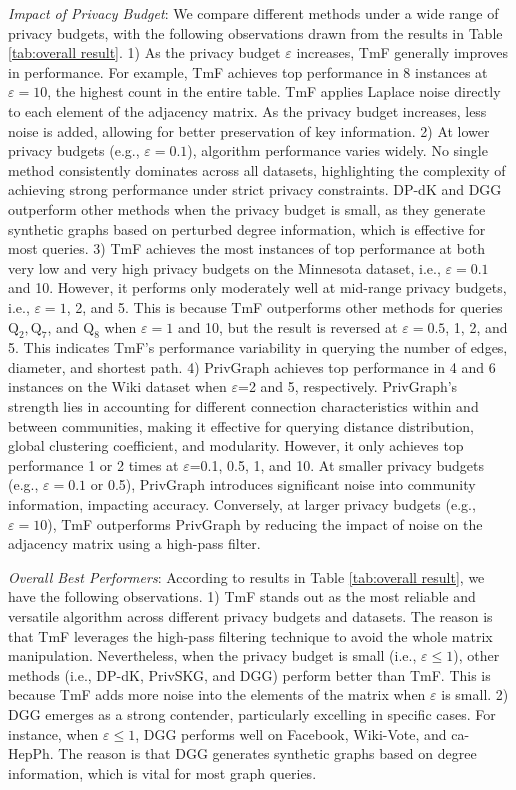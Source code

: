 \documentclass[conference]{IEEEtran}
\theoremstyle{plain}
\begin{document}
\textit{Impact of Privacy Budget}:
We compare different methods under a wide range of privacy budgets, with the following observations drawn from the results in Table \ref{tab:overall result}.
1) As the privacy budget $\varepsilon$ increases, TmF generally improves in performance. 
For example, TmF achieves top performance in 8 instances at $\varepsilon = 10$, the highest count in the entire table. 
TmF applies Laplace noise directly to each element of the adjacency matrix. 
As the privacy budget increases, less noise is added, allowing for better preservation of key information.
2) At lower privacy budgets (e.g., $\varepsilon = 0.1$), algorithm performance varies widely. 
No single method consistently dominates across all datasets, highlighting the complexity of achieving strong performance under strict privacy constraints. 
DP-dK and DGG outperform other methods when the privacy budget is small, as they generate synthetic graphs based on perturbed degree information, which is effective for most queries.
3) TmF achieves the most instances of top performance at both very low and very high privacy budgets on the Minnesota dataset, i.e., $\varepsilon=0.1$ and 10. 
However, it performs only moderately well at mid-range privacy budgets, i.e., $\varepsilon=1$, 2, and 5. 
This is because TmF outperforms other methods for queries ${\text{Q}_2}, {\text{Q}_7}$, and ${\text{Q}_8}$ when $\varepsilon=1$ and 10, but the result is reversed at $\varepsilon=0.5$, 1, 2, and 5. 
This indicates TmF’s performance variability in querying the number of edges, diameter, and shortest path.
4) PrivGraph achieves top performance in 4 and 6 instances on the Wiki dataset when $\varepsilon$=2 and 5, respectively. PrivGraph’s strength lies in accounting for different connection characteristics within and between communities, making it effective for querying distance distribution, global clustering coefficient, and modularity. However, it only achieves top performance 1 or 2 times at $\varepsilon$=0.1, 0.5, 1, and 10. At smaller privacy budgets (e.g., $\varepsilon=0.1$ or 0.5), PrivGraph introduces significant noise into community information, impacting accuracy. 
Conversely, at larger privacy budgets (e.g., $\varepsilon=10$), TmF outperforms PrivGraph by reducing the impact of noise on the adjacency matrix using a high-pass filter.

\textit{Overall Best Performers}:
According to results in Table \ref{tab:overall result}, we have the following observations.
1) TmF stands out as the most reliable and versatile algorithm across different privacy budgets and datasets.
The reason is that TmF leverages the high-pass filtering technique to avoid the whole matrix manipulation.
Nevertheless, when the privacy budget is small (i.e., $\varepsilon \leq 1$), other methods (i.e., DP-dK, PrivSKG, and DGG) perform better than TmF.
This is because TmF adds more noise into the elements of the matrix when $\varepsilon$ is small.
2) DGG emerges as a strong contender, particularly excelling in specific cases.
For instance, when $\varepsilon \leq 1$, DGG performs well on Facebook, Wiki-Vote, and ca-HepPh.
The reason is that DGG generates synthetic graphs based on degree information, which is vital for most graph queries.
\end{document}
